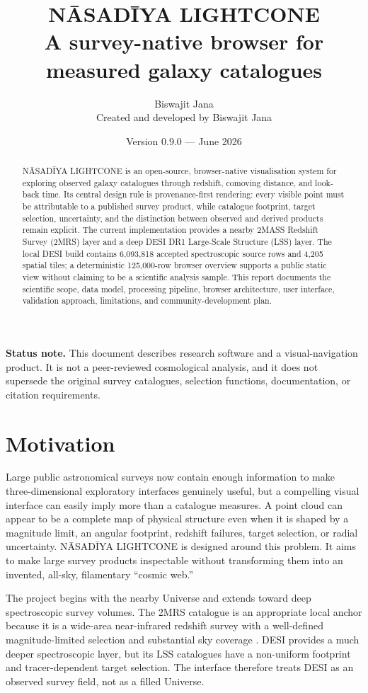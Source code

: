 \documentclass[11pt,a4paper]{article}
\title{\textbf{N\={A}SAD\={I}YA LIGHTCONE}\\[4pt]\large A survey-native browser for measured galaxy catalogues}
\author{Biswajit Jana\\\small Created and developed by Biswajit Jana}
\date{Version 0.9.0 --- June 2026}
\begin{document}
\maketitle

\begin{abstract}
N\={A}SAD\={I}YA LIGHTCONE is an open-source, browser-native visualisation system for exploring observed galaxy catalogues through redshift, comoving distance, and look-back time. Its central design rule is provenance-first rendering: every visible point must be attributable to a published survey product, while catalogue footprint, target selection, uncertainty, and the distinction between observed and derived products remain explicit. The current implementation provides a nearby 2MASS Redshift Survey (2MRS) layer and a deep DESI DR1 Large-Scale Structure (LSS) layer. The local DESI build contains 6,093,818 accepted spectroscopic source rows and 4,205 spatial tiles; a deterministic 125,000-row browser overview supports a public static view without claiming to be a scientific analysis sample. This report documents the scientific scope, data model, processing pipeline, browser architecture, user interface, validation approach, limitations, and community-development plan.
\end{abstract}

\textbf{Status note.} This document describes research software and a visual-navigation product. It is not a peer-reviewed cosmological analysis, and it does not supersede the original survey catalogues, selection functions, documentation, or citation requirements.

\section{Motivation}

Large public astronomical surveys now contain enough information to make three-dimensional exploratory interfaces genuinely useful, but a compelling visual interface can easily imply more than a catalogue measures. A point cloud can appear to be a complete map of physical structure even when it is shaped by a magnitude limit, an angular footprint, redshift failures, target selection, or radial uncertainty. N\={A}SAD\={I}YA LIGHTCONE is designed around this problem. It aims to make large survey products inspectable without transforming them into an invented, all-sky, filamentary ``cosmic web.''

The project begins with the nearby Universe and extends toward deep spectroscopic survey volumes. The 2MRS catalogue is an appropriate local anchor because it is a wide-area near-infrared redshift survey with a well-defined magnitude-limited selection and substantial sky coverage \cite{Huchra2012}. DESI provides a much deeper spectroscopic layer, but its LSS catalogues have a non-uniform footprint and tracer-dependent target selection. The interface therefore treats DESI as an observed survey field, not as a filled Universe.
\end{document}
